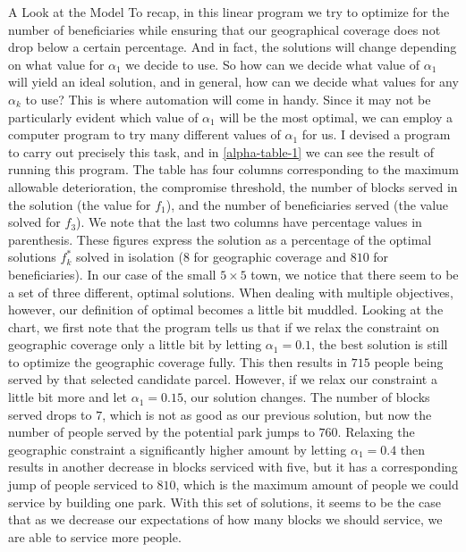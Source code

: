 \documentclass[12pt]{pom_thesis}
\theoremstyle{definition}
\begin{document}
\begin{chapter}{A Look at the Model}
To recap, in this linear program we try to optimize for the number of beneficiaries while ensuring that our geographical coverage does not drop below a certain percentage. And in fact, the solutions will change depending on what value for $\alpha_1$ we decide to use. So how can we decide what value of $\alpha_1$ will yield an ideal solution, and in general, how can we decide what values for any $\alpha_k$ to use? This is where automation will come in handy. Since it may not be particularly evident which value of $\alpha_1$ will be the most optimal, we can employ a computer program to try many different values of $\alpha_1$ for us. I devised a program to carry out precisely this task, and in \autoref{alpha-table-1} we can see the result of running this program. The table has four columns corresponding to the maximum allowable deterioration, the compromise threshold, the number of blocks served in the solution (the value for $f_1$), and  the number of beneficiaries served (the value solved for $f_3$). We note that the last two columns have percentage values in parenthesis. These figures express the solution as a percentage of the optimal solutions $f_k^*$ solved in isolation ($8$ for geographic coverage and $810$ for beneficiaries). In our case of the small $5 \times 5$ town, we notice that there seem to be a set of three different, optimal solutions. When dealing with multiple objectives, however, our definition of optimal becomes a little bit muddled. Looking at the chart, we first note that the program tells us that if we relax the constraint on geographic coverage only a little bit by letting $\alpha_1 = 0.1$, the best solution is still to optimize the geographic coverage fully. This then results in $715$ people being served by that selected candidate parcel. However, if we relax our constraint a little bit more and let $\alpha_1 = 0.15$, our solution changes. The number of blocks served drops to $7$, which is not as good as our previous solution, but now the number of people served by the potential park jumps to $760$. Relaxing the geographic constraint a significantly higher amount by letting $\alpha_1 = 0.4$ then results in another decrease in blocks serviced with five, but it has a corresponding jump of people serviced to $810$, which is the maximum amount of people we could service by building one park. With this set of solutions, it seems to be the case that as we decrease our expectations of how many blocks we should service, we are able to service more people. \\


\end{chapter}
\end{document}
